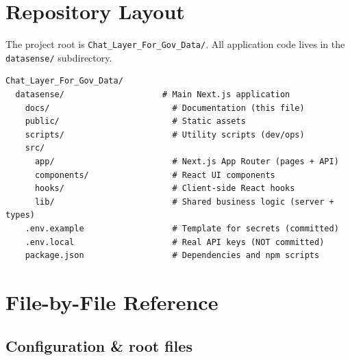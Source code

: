 \documentclass[11pt,a4paper]{article}
\begin{document}
\section{Repository Layout}

The project root is \texttt{Chat\_Layer\_For\_Gov\_Data/}. All application code lives in the \texttt{datasense/} subdirectory.

\begin{lstlisting}
Chat_Layer_For_Gov_Data/
  datasense/                    # Main Next.js application
    docs/                         # Documentation (this file)
    public/                       # Static assets
    scripts/                      # Utility scripts (dev/ops)
    src/
      app/                        # Next.js App Router (pages + API)
      components/                 # React UI components
      hooks/                      # Client-side React hooks
      lib/                        # Shared business logic (server + types)
    .env.example                  # Template for secrets (committed)
    .env.local                    # Real API keys (NOT committed)
    package.json                  # Dependencies and npm scripts
\end{lstlisting}

\section{File-by-File Reference}

\subsection{Configuration \& root files}
\end{document}
